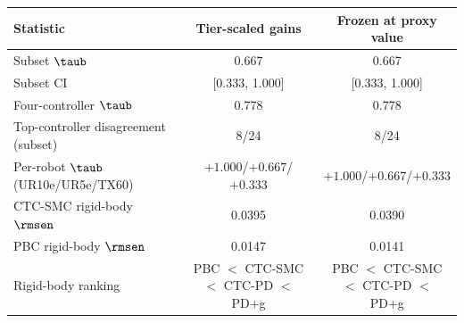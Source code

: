 \begin{tabular}{lcc}
\toprule
Statistic & Tier-scaled gains & Frozen at proxy value \\
\midrule
Subset $\taub$ & 0.667 & 0.667 \\
Subset CI & [0.333, 1.000] & [0.333, 1.000] \\
Four-controller $\taub$ & 0.778 & 0.778 \\
Top-controller disagreement (subset) & 8/24 & 8/24 \\
Per-robot $\taub$ (UR10e/UR5e/TX60) & $+1.000$/$+0.667$/$+0.333$ & $+1.000$/$+0.667$/$+0.333$ \\
\midrule
CTC-SMC rigid-body $\rmsen$ & 0.0395 & 0.0390 \\
PBC rigid-body $\rmsen$ & 0.0147 & 0.0141 \\
Rigid-body ranking & PBC $<$ CTC-SMC $<$ CTC-PD $<$ PD+g & PBC $<$ CTC-SMC $<$ CTC-PD $<$ PD+g \\
\bottomrule
\end{tabular}
